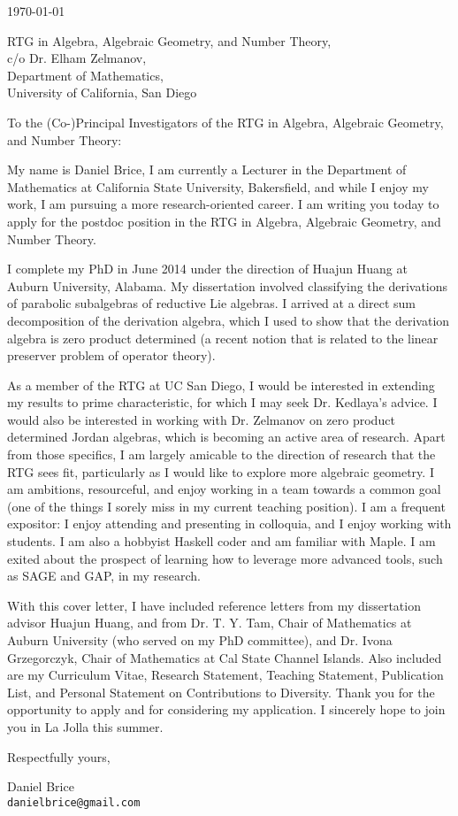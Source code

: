 \documentclass[11pt]{article}
\begin{document}
\makeletterhead{}

\vfill

\today

\vfill

RTG in Algebra, Algebraic Geometry, and Number Theory,\\
c/o Dr. Elham Zelmanov,\\
Department of Mathematics,\\
University of California, San Diego

\vfill

To the (Co-)Principal Investigators of the RTG in Algebra, Algebraic
Geometry, and Number Theory:

\vfill

My name is Daniel Brice, I am currently a Lecturer in the Department of
Mathematics at California State University, Bakersfield, and while I
enjoy my work, I am pursuing a more research-oriented career. I am
writing you today to apply for the postdoc position in the RTG in
Algebra, Algebraic Geometry, and Number Theory.

I complete my PhD in June 2014 under the direction of Huajun Huang at
Auburn University, Alabama. My dissertation involved classifying the
derivations of parabolic subalgebras of reductive Lie algebras. I
arrived at a direct sum decomposition of the derivation algebra, which I
used to show that the derivation algebra is zero product determined (a
recent notion that is related to the linear preserver problem of
operator theory).

As a member of the RTG at UC San Diego, I would be interested in
extending my results to prime characteristic, for which I may seek Dr.
Kedlaya's advice. I would also be interested in working with Dr.
Zelmanov on zero product determined Jordan algebras, which is becoming
an active area of research. Apart from those specifics, I am largely
amicable to the direction of research that the RTG sees fit,
particularly as I would like to explore more algebraic geometry. I am
ambitions, resourceful, and enjoy working in a team towards a common
goal (one of the things I sorely miss in my current teaching position).
I am a frequent expositor: I enjoy attending and presenting in
colloquia, and I enjoy working with students. I am also a hobbyist
Haskell coder and am familiar with Maple. I am exited about the prospect
of learning how to leverage more advanced tools, such as SAGE and GAP,
in my research.

With this cover letter, I have included reference letters from my
dissertation advisor Huajun Huang, and from Dr. T. Y. Tam, Chair of
Mathematics at Auburn University (who served on my PhD committee), and
Dr. Ivona Grzegorczyk, Chair of Mathematics at Cal State Channel
Islands. Also included are my Curriculum Vitae, Research Statement,
Teaching Statement, Publication List, and Personal Statement on
Contributions to Diversity. Thank you for the opportunity to apply and
for considering my application. I sincerely hope to join you in La Jolla
this summer.

\vfill

Respectfully yours,

\vfill

Daniel Brice\\
\texttt{danielbrice@gmail.com}

\label{page:last}
\end{document}
